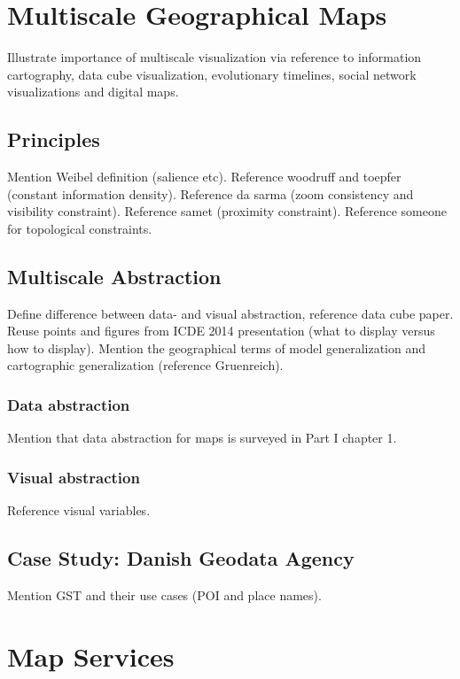 \documentclass[11pt, oneside]{report}   	%
\begin{document}
\chapter{Multiscale Geographical Maps}
Illustrate importance of multiscale visualization via reference to information cartography, data cube visualization, evolutionary timelines, social network visualizations and digital maps.

\section{Principles}
Mention Weibel definition (salience etc). Reference woodruff and toepfer (constant information density). Reference da sarma (zoom consistency and visibility constraint). Reference samet (proximity constraint). Reference someone for topological constraints.

\section{Multiscale Abstraction}
Define difference between data- and visual abstraction, reference data cube paper. Reuse points and figures from ICDE 2014 presentation (what to display versus how to display). Mention the geographical terms of model generalization and cartographic generalization (reference Gruenreich). 

\subsection{Data abstraction}
Mention that data abstraction for maps is surveyed in Part I chapter 1.

\subsubsection{}

\subsection{Visual abstraction}
Reference visual variables.

\section{Case Study: Danish Geodata Agency}
Mention GST and their use cases (POI and place names).

\chapter{Map Services}
\end{document}
